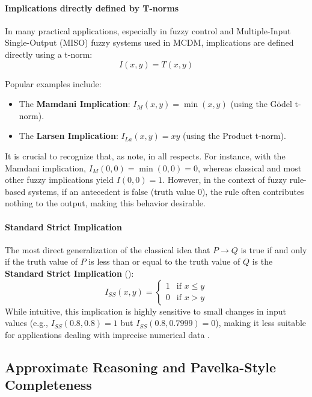 \paragraph{Implications directly defined by T-norms}
In many practical applications, especially in fuzzy control and Multiple-Input Single-Output (MISO) fuzzy systems used in MCDM, implications are defined directly using a t-norm:
\[I(x,y) = T(x,y)\]
\begin{example}
Popular examples include:
\begin{itemize}
    \item The \textbf{Mamdani Implication}: $I_M(x,y) = \min(x,y)$ (using the Gödel t-norm).
    \item The \textbf{Larsen Implication}: $I_{La}(x,y) = xy$ (using the Product t-norm).
\end{itemize}
\end{example}
It is crucial to recognize that, as \cite[p.60]{FULLER2} note,  in all respects. For instance, with the Mamdani implication, $I_M(0,0) = \min(0,0) = 0$, whereas classical and most other fuzzy implications yield $I(0,0)=1$. However, in the context of fuzzy rule-based systems, if an antecedent is false (truth value 0), the rule often contributes nothing to the output, making this behavior desirable.

\paragraph{Standard Strict Implication}
The most direct generalization of the classical idea that $P \rightarrow Q$ is true if and only if the truth value of $P$ is less than or equal to the truth value of $Q$ is the \textbf{Standard Strict Implication} (\cite[p.58]{FULLER2}):
\[I_{SS}(x,y) = \begin{cases} 1 & \text{if } x \le y \\ 0 & \text{if } x > y \end{cases}\]
While intuitive, this implication is highly sensitive to small changes in input values (e.g., $I_{SS}(0.8, 0.8)=1$ but $I_{SS}(0.8, 0.7999)=0$), making it less suitable for applications dealing with imprecise numerical data \cite[p.58]{FULLER2}.

\subsection{Approximate Reasoning and Pavelka-Style Completeness}

